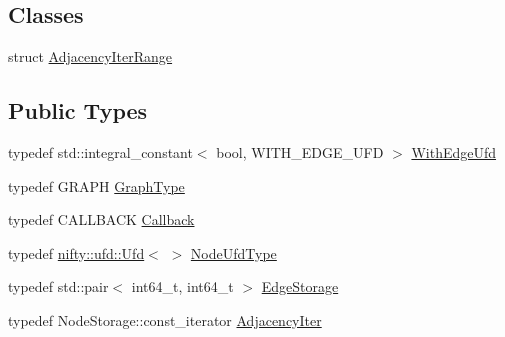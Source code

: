 \subsection*{Classes}
\begin{DoxyCompactItemize}
\item 
struct \hyperlink{structnifty_1_1graph_1_1EdgeContractionGraph_1_1AdjacencyIterRange}{Adjacency\+Iter\+Range}
\end{DoxyCompactItemize}
\subsection*{Public Types}
\begin{DoxyCompactItemize}
\item 
typedef std\+::integral\+\_\+constant$<$ bool, W\+I\+T\+H\+\_\+\+E\+D\+G\+E\+\_\+\+U\+FD $>$ \hyperlink{classnifty_1_1graph_1_1EdgeContractionGraph_a9b33be5b2975fe298604326c10df1f93}{With\+Edge\+Ufd}
\item 
typedef G\+R\+A\+PH \hyperlink{classnifty_1_1graph_1_1EdgeContractionGraph_a67f653761dbc2c203891b041aacc3f04}{Graph\+Type}
\item 
typedef C\+A\+L\+L\+B\+A\+CK \hyperlink{classnifty_1_1graph_1_1EdgeContractionGraph_a75e91e51c78d2f427a31c30dcd8996ed}{Callback}
\item 
typedef \hyperlink{classnifty_1_1ufd_1_1Ufd}{nifty\+::ufd\+::\+Ufd}$<$ $>$ \hyperlink{classnifty_1_1graph_1_1EdgeContractionGraph_a7ff98238621f4b534e89b1880ee77239}{Node\+Ufd\+Type}
\item 
typedef std\+::pair$<$ int64\+\_\+t, int64\+\_\+t $>$ \hyperlink{classnifty_1_1graph_1_1EdgeContractionGraph_ad57e807f7df20892c7bbbb9b53d3aa08}{Edge\+Storage}
\item 
typedef Node\+Storage\+::const\+\_\+iterator \hyperlink{classnifty_1_1graph_1_1EdgeContractionGraph_a447212f5ced0c4ef4d304e8b89f4f200}{Adjacency\+Iter}
\end{DoxyCompactItemize}
